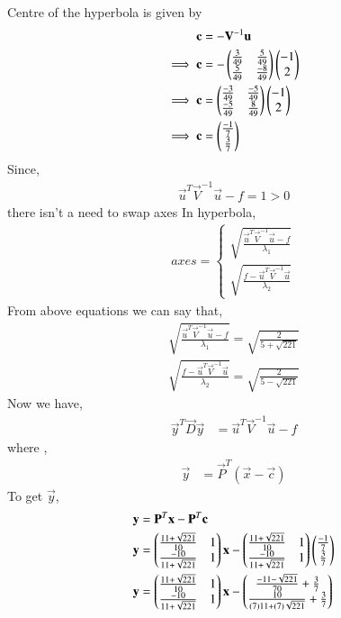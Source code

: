Centre of the hyperbola is given by 
\begin{align}
    \mathbf{c}&=-\mathbf{V}^{-1}\mathbf{u}\\
    \implies\mathbf{c}&=-\begin{pmatrix}\frac{3}{49}&\frac{5}{49}\\\frac{5}{49}&\frac{-8}{49}\end{pmatrix}\begin{pmatrix}-1 \\ 2\end{pmatrix}\\
    \implies\mathbf{c}&=\begin{pmatrix}\frac{-3}{49}&\frac{-5}{49}\\\frac{-5}{49}&\frac{8}{49}\end{pmatrix}\begin{pmatrix}-1 \\ 2\end{pmatrix}\\
    \implies\mathbf{c}&=\begin{pmatrix}\frac{-1}{7}\\\frac{3}{7}\end{pmatrix}
\end{align}
Since,
\begin{align}
    \vec{u}^T\vec{V}^{-1}\vec{u}-f = 1 > 0\label{eq:solutions/40/7/eq:es71/cond}
\end{align} 
there isn't a need to swap axes
In hyperbola,
\begin{align}
axes=
\begin{cases}
\sqrt{\frac{\vec{u}^T\vec{V}^{-1}\vec{u}-f}{\lambda_1}}\\ \sqrt{\frac{f-\vec{u}^T\vec{V}^{-1}\vec{u}}{\lambda_2}}
\end{cases}
\end{align}
From above equations we can say that,
\begin{align}
\sqrt{\frac{\vec{u}^T\vec{V}^{-1}\vec{u}-f}{\lambda_1}}=\sqrt{ \frac{2}{5+\sqrt{221}}}\\
\sqrt{\frac{f-\vec{u}^T\vec{V}^{-1}\vec{u}}{\lambda_2}}=\sqrt{ \frac{2}{5-\sqrt{221}}}
\end{align}
Now we have,
\begin{align}
    \vec{y}^T\vec{D}\vec{y}&=\vec{u}^T\vec{V}^{-1}\vec{u}-f\label{eq:solutions/40/7/eq:es71/fi}
\end{align}
where ,
\begin{align}
    \vec{y}&=\vec{P}^T(\vec{x}-\vec{c})
\end{align}
To get $\vec{y}$,
\begin{align}
\mathbf{y}&=\mathbf{P}^T\mathbf{x}-\mathbf{P}^T\mathbf{c}\\
    \mathbf{y}&= \begin{pmatrix}\frac{11+\sqrt{221}}{10} & 1 \\ \frac{-10}{11+\sqrt{221}} & 1\end{pmatrix}\mathbf{x}-\begin{pmatrix}\frac{11+\sqrt{221}}{10} & 1 \\ \frac{-10}{11+\sqrt{221}} & 1\end{pmatrix}\begin{pmatrix}\frac{-1}{7}\\\frac{3}{7}\end{pmatrix}\\
    \mathbf{y}&=\begin{pmatrix}\frac{11+\sqrt{221}}{10} & 1 \\ \frac{-10}{11+\sqrt{221}} & 1\end{pmatrix}\mathbf{x}-\begin{pmatrix}\frac{-11-\sqrt{221}}{70}+\frac{3}{7} \\ \frac{10}{(7)11+(7)\sqrt{221}}+\frac{3}{7}\end{pmatrix}
\end{align}
